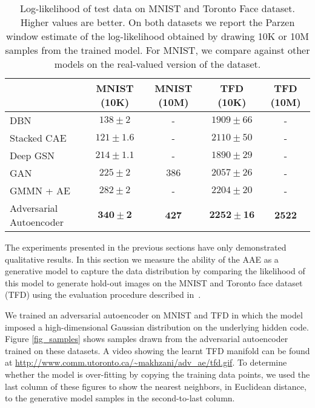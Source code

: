 \documentclass{article}
\begin{document}
\begin{center}
\begin{table}[t]
\small
\centering \begin{tabular}{ l  || c || c || c || c}
  \hline
  & MNIST (10K) & MNIST (10M) & TFD (10K) & TFD (10M)\\
  \hline

  DBN \citep{geoff} & $138 \pm 2$ & - & $1909 \pm 66$ & -\\
  Stacked CAE \citep{stacked_cae} & $121 \pm 1.6$ & - & $2110 \pm 50$ & -  \\
  Deep GSN \citep{gsn} & $214 \pm 1.1$ & - & $1890   \pm 29$ & - \\
  GAN \citep{gan} & $225 \pm 2$ & $386$ & $2057 \pm 26$ & -\\
  GMMN + AE \citep{gmmn} & $282 \pm 2$ & - & $2204 \pm 20$ & -\\
  Adversarial Autoencoder & $\mathbf{340} \pm \mathbf{2}$ & $\mathbf{427}$ & $\mathbf{2252} \pm \mathbf{16}$ & $\mathbf{2522}$\\
  \hline
\end{tabular}
\caption{\label{table:table_mnist}Log-likelihood of test data on MNIST and Toronto Face dataset. Higher values are better. On both datasets we report the Parzen window estimate of the log-likelihood obtained by drawing 10K or 10M samples from the trained model. For MNIST, we compare against other models on the real-valued version of the dataset.}
\end{table}
\end{center}

The experiments presented in the previous sections have only demonstrated qualitative results.
In this section we measure the ability of the AAE as a generative model to capture the data distribution by comparing the likelihood of this model to generate hold-out images on the MNIST and Toronto face dataset (TFD) using the evaluation procedure described in~\citep{gan}.

We trained an adversarial autoencoder on MNIST and TFD in which the model imposed a high-dimensional Gaussian distribution on the underlying hidden code.
Figure \ref{fig_samples} shows samples drawn from the adversarial autoencoder trained on these datasets. 
A video showing the learnt TFD manifold can be found at \url{http://www.comm.utoronto.ca/~makhzani/adv_ae/tfd.gif}. 
To determine whether the model is over-fitting by copying the training data points, we used the last column of these figures to show the nearest neighbors, in Euclidean distance, to the generative model samples in the second-to-last column.
\end{document}
